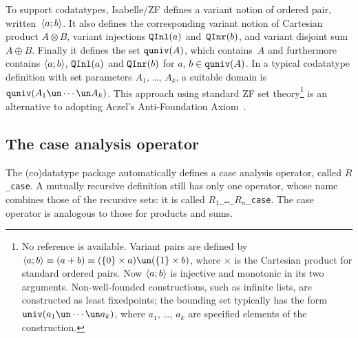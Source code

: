 To support codatatypes, Isabelle/ZF defines a variant notion of ordered
pair, written~$\langle a;b\rangle$.  It also defines the corresponding variant
notion of Cartesian product $A\otimes B$, variant injections ${\tt QInl}(a)$
and~${\tt QInr}(b)$, and variant disjoint sum $A\oplus B$.  Finally it defines
the set ${\tt quniv}(A)$, which contains~$A$ and furthermore contains
$\langle a;b\rangle$, ${\tt QInl}(a)$ and ${\tt QInr}(b)$ for $a$, $b\in{\tt quniv}(A)$.  In a
typical codatatype definition with set parameters $A_1$, \ldots, $A_k$, a
suitable domain is $\quniv(A_1\un\cdots\un A_k)$.  This approach using
standard ZF set theory\footnote{No reference is available.  Variant pairs
  are defined by $\pair{a;b}\equiv (a+b) \equiv (\{0\}\times a) \un
  (\{1\}\times b)$, where $\times$ is the Cartesian product for standard
  ordered pairs.  Now
  $\langle a;b\rangle$ is injective and monotonic in its two arguments.
  Non-well-founded constructions, such as infinite lists, are constructed
  as least fixedpoints; the bounding set typically has the form
  $\univ(a_1\un\cdots\un a_k)$, where $a_1$, \ldots, $a_k$ are specified
  elements of the construction.}
is an alternative to adopting Aczel's Anti-Foundation
Axiom~\cite{aczel88}.

\subsection{The case analysis operator}
The (co)datatype package automatically defines a case analysis operator,
called {\tt$R$\_case}.  A mutually recursive definition still has only one
operator, whose name combines those of the recursive sets: it is called
{\tt$R_1$\_\ldots\_$R_n$\_case}.  The case operator is analogous to those
for products and sums.


